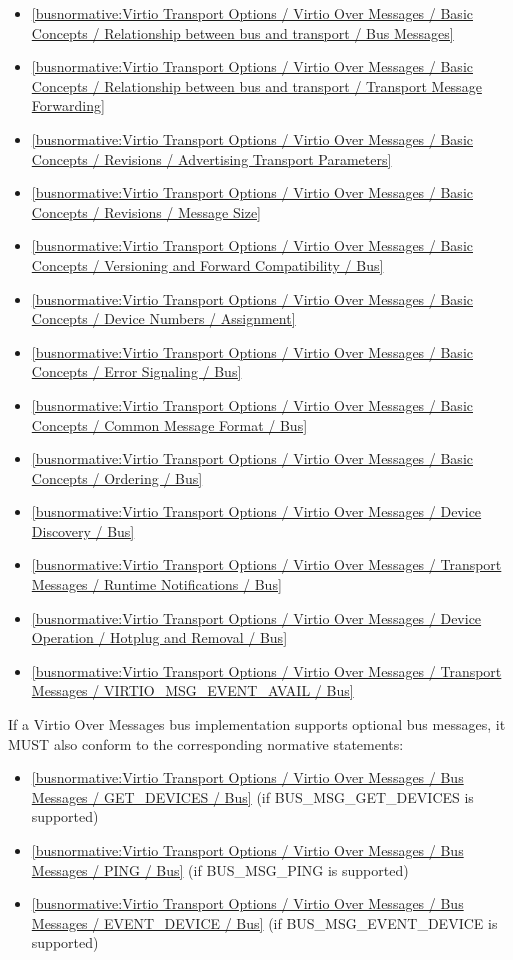 \begin{itemize}
\item \ref{busnormative:Virtio Transport Options / Virtio Over Messages / Basic Concepts / Relationship between bus and transport / Bus Messages}
\item \ref{busnormative:Virtio Transport Options / Virtio Over Messages / Basic Concepts / Relationship between bus and transport / Transport Message Forwarding}
\item \ref{busnormative:Virtio Transport Options / Virtio Over Messages / Basic Concepts / Revisions / Advertising Transport Parameters}
\item \ref{busnormative:Virtio Transport Options / Virtio Over Messages / Basic Concepts / Revisions / Message Size}
\item \ref{busnormative:Virtio Transport Options / Virtio Over Messages / Basic Concepts / Versioning and Forward Compatibility / Bus}
\item \ref{busnormative:Virtio Transport Options / Virtio Over Messages / Basic Concepts / Device Numbers / Assignment}
\item \ref{busnormative:Virtio Transport Options / Virtio Over Messages / Basic Concepts / Error Signaling / Bus}
\item \ref{busnormative:Virtio Transport Options / Virtio Over Messages / Basic Concepts / Common Message Format / Bus}
\item \ref{busnormative:Virtio Transport Options / Virtio Over Messages / Basic Concepts / Ordering / Bus}
\item \ref{busnormative:Virtio Transport Options / Virtio Over Messages / Device Discovery / Bus}
\item \ref{busnormative:Virtio Transport Options / Virtio Over Messages / Transport Messages / Runtime Notifications / Bus}
\item \ref{busnormative:Virtio Transport Options / Virtio Over Messages / Device Operation / Hotplug and Removal / Bus}
\item \ref{busnormative:Virtio Transport Options / Virtio Over Messages / Transport Messages / VIRTIO_MSG_EVENT_AVAIL / Bus}
\end{itemize}

If a Virtio Over Messages bus implementation supports optional bus messages, it
MUST also conform to the corresponding normative statements:

\begin{itemize}
\item \ref{busnormative:Virtio Transport Options / Virtio Over Messages / Bus Messages / GET_DEVICES / Bus} (if BUS_MSG_GET_DEVICES is supported)
\item \ref{busnormative:Virtio Transport Options / Virtio Over Messages / Bus Messages / PING / Bus} (if BUS_MSG_PING is supported)
\item \ref{busnormative:Virtio Transport Options / Virtio Over Messages / Bus Messages / EVENT_DEVICE / Bus} (if BUS_MSG_EVENT_DEVICE is supported)
\end{itemize}

